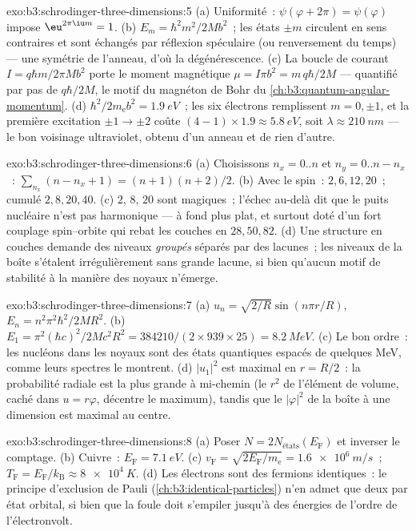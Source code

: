 \begin{solution}{exo:b3:schrodinger-three-dimensions:5}
(a) Uniformité~: $\psi(\varphi + 2\pi) = \psi(\varphi)$ impose
$\eu^{2\pi\iu m} = 1$. (b) $E_m = \hbar^2m^2/2Mb^2$~; les états $\pm
m$ circulent en sens contraires et sont échangés par réflexion
spéculaire (ou renversement du temps) --- une symétrie de l'anneau,
d'où la dégénérescence. (c) La boucle de courant $I = q\hbar m/2\pi Mb^2$
porte le moment magnétique $\mu = I\pi b^2 = m\,q\hbar/2M$ --- quantifié
par pas de $q\hbar/2M$, le motif du magnéton de Bohr du
\cref{ch:b3:quantum-angular-momentum}.
(d) $\hbar^2/2m_{\text{e}}b^2 = \qty{1.9}{eV}$~; les six électrons
remplissent $m = 0, \pm1$, et la première excitation $\pm1 \to \pm2$
coûte $(4-1) \times 1.9 \approx \qty{5.8}{eV}$, soit $\lambda \approx
\qty{210}{nm}$ --- le bon voisinage ultraviolet, obtenu d'un anneau et
de rien d'autre.
\end{solution}

\begin{solution}{exo:b3:schrodinger-three-dimensions:6}
(a) Choisissons $n_x = 0..n$ et $n_y = 0..n - n_x$~: $\sum_{n_x}(n - n_x
+ 1) = (n+1)(n+2)/2$. (b) Avec le spin~: $2, 6, 12, 20$~; cumulé $2,
8, 20, 40$. (c) $2$, $8$, $20$ sont magiques~; l'échec au-delà dit que
le puits nucléaire n'est pas harmonique --- à fond plus plat, et
surtout doté d'un fort couplage spin--orbite qui rebat les couches en
$28, 50, 82$. (d) Une structure en couches demande des niveaux
\emph{groupés} séparés par des lacunes~; les niveaux de la boîte
s'étalent irrégulièrement sans grande lacune, si bien qu'aucun motif de
stabilité à la manière des noyaux n'émerge.
\end{solution}

\begin{solution}{exo:b3:schrodinger-three-dimensions:7}
(a) $u_n = \sqrt{2/R}\sin(n\pi r/R)$, $E_n = n^2\pi^2\hbar^2/2MR^2$.
(b) $E_1 = \pi^2(\hbar c)^2/2Mc^2R^2 = 384210/(2 \times 939 \times
25) = \qty{8.2}{MeV}$. (c) Le bon ordre~: les nucléons dans les noyaux
sont des états quantiques espacés de quelques MeV, comme leurs spectres
le montrent. (d) $|u_1|^2$ est maximal en $r = R/2$~: la probabilité
radiale est la plus grande à mi-chemin (le $r^2$ de l'élément de
volume, caché dans $u = r\varphi$, décentre le maximum), tandis que le
$|\varphi|^2$ de la boîte à une dimension est maximal au centre.
\end{solution}

\begin{solution}{exo:b3:schrodinger-three-dimensions:8}
(a) Poser $N = 2N_{\text{états}}(E_{\text{F}})$ et inverser le
comptage. (b) Cuivre~: $E_{\text{F}} = \qty{7.1}{eV}$. (c) $v_{\text{F}} =
\sqrt{2E_{\text{F}}/m_{\text{e}}} = \qty{1.6e6}{m/s}$~;
$T_{\text{F}} = E_{\text{F}}/k_{\text{B}} \approx \qty{8e4}{K}$. (d)
Les électrons sont des fermions identiques~: le principe d'exclusion de
Pauli (\cref{ch:b3:identical-particles}) n'en admet que deux par état
orbital, si bien que la foule doit s'empiler jusqu'à des énergies de
l'ordre de l'électronvolt.
\end{solution}

